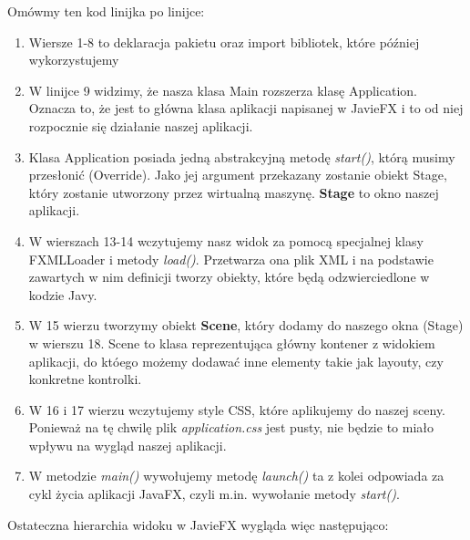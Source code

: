 \documentclass[letterpaper,10pt,english]{sphinxmanual}
\begin{document}
Omówmy ten kod linijka po linijce:
\begin{enumerate}
\item {} 
Wiersze 1-8 to deklaracja pakietu oraz import bibliotek, które później wykorzystujemy

\item {} 
W linijce 9 widzimy, że nasza klasa Main rozszerza klasę Application. Oznacza to, że jest to główna klasa aplikacji napisanej w JavieFX i to od niej rozpocznie się działanie naszej aplikacji.

\item {} 
Klasa Application posiada jedną abstrakcyjną metodę \emph{start()}, którą musimy przesłonić (Override). Jako jej argument przekazany zostanie obiekt Stage, który zostanie utworzony przez wirtualną maszynę. \textbf{Stage} to okno naszej aplikacji.

\item {} 
W wierszach 13-14 wczytujemy nasz widok za pomocą specjalnej klasy FXMLLoader i metody \emph{load()}. Przetwarza ona plik XML i na podstawie zawartych w nim definicji tworzy obiekty, które będą odzwierciedlone w kodzie Javy.

\item {} 
W 15 wierzu tworzymy obiekt \textbf{Scene}, który dodamy do naszego okna (Stage) w wierszu 18. Scene to klasa reprezentująca główny kontener z widokiem aplikacji, do któego możemy dodawać inne elementy takie jak layouty, czy konkretne kontrolki.

\item {} 
W 16 i 17 wierzu wczytujemy style CSS, które aplikujemy do naszej sceny. Ponieważ na tę chwilę plik \emph{application.css} jest pusty, nie będzie to miało wpływu na wygląd naszej aplikacji.

\item {} 
W metodzie \emph{main()} wywołujemy metodę \emph{launch()} ta z kolei odpowiada za cykl życia aplikacji JavaFX, czyli m.in. wywołanie metody \emph{start()}.

\end{enumerate}

Ostateczna hierarchia widoku w JavieFX wygląda więc następująco:
\end{document}
